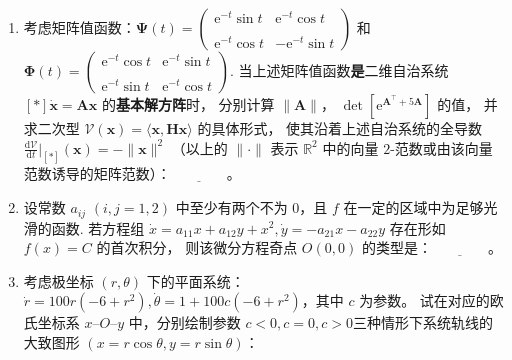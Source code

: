 \begin{enumerate}
\item 考虑矩阵值函数：$\boldsymbol{\Psi}(t)=\begin{pmatrix}
    \mathrm{e}^{-t} \sin t & \mathrm{e}^{-t} \cos t \\ \\
    \mathrm{e}^{-t} \cos t & -\mathrm{e}^{-t} \sin t\end{pmatrix}$ 
和 $\boldsymbol{\Phi}(t)=\begin{pmatrix}
    \mathrm{e}^{-t} \cos t & \mathrm{e}^{-t} \sin t \\ \\
    \mathrm{e}^{-t} \sin t & \mathrm{e}^{-t} \cos t\end{pmatrix}$.
当上述矩阵值函数\textbf{是}二维自治系统 $[*] \dot{\boldsymbol{x}}=\boldsymbol{A x}$ 的\textbf{基本解方阵}时，
分别计算 $\|\boldsymbol{A}\|$， $\det\left[\mathrm{e}^{\boldsymbol{A}^{\top}+5 \boldsymbol{A}}\right]$ 的值，
并求二次型 $\mathcal{V}(\boldsymbol{x})=\langle\boldsymbol{x}, \boldsymbol{H} \boldsymbol{x}\rangle$ 的具体形式，
使其沿着上述自治系统的全导数 $\frac{\mathrm{d} \mathcal{V}}{\mathrm{d} t}\big|_{[*]}(\boldsymbol{x})=-\|\boldsymbol{x}\|^{2}$
（以上的 $\|\cdot\|$ 表示 $\mathbb{R}^{2}$ 中的向量 $2$-范数或由该向量范数诱导的矩阵范数）：$\underline{\qquad\qquad}$。

\item 设常数 $a_{i j}$ $(i, j=1,2)$ 中至少有两个不为 $0$，且 $f$ 在一定的区域中为足够光滑的函数. 
若方程组 $\dot{x}=a_{11} x+a_{12} y+x^{2}, \dot{y}=-a_{21} x-a_{22} y$ 存在形如 $f(x)=C$ 的首次积分，
则该微分方程奇点 $O(0,0)$ 的类型是：$\underline{\qquad\qquad}$。

\item 考虑极坐标 $(r, \theta)$ 下的平面系统：$\dot{r}=100 r(-6+r^{2}), \dot{\theta}=1+100 c(-6+r^{2})$，其中 $c$ 为参数。
试在对应的欧氏坐标系 $x$--$O$--$y$ 中，分别绘制参数 $c<0, c=0, c>0$三种情形下系统轨线的大致图形 $(x=r \cos \theta, y=r \sin \theta)$：
\end{enumerate}

